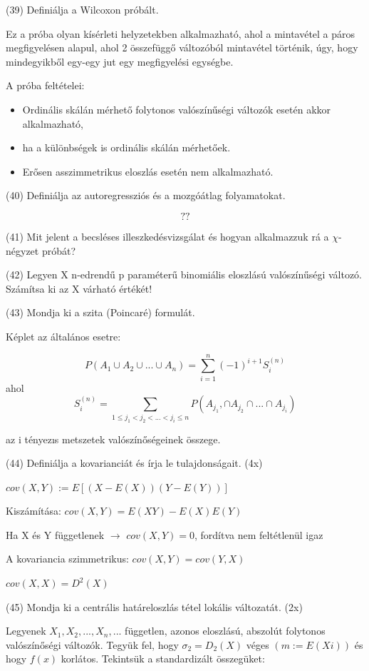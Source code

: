 \documentclass[12p]{article}
\begin{document}
(39) Definiálja a Wilcoxon próbált.

Ez a próba olyan kísérleti helyzetekben alkalmazható, ahol a mintavétel a páros megfigyelésen alapul, ahol 2 összefüggő változóból mintavétel történik, úgy, hogy mindegyikből egy-egy jut egy megfigyelési egységbe.

A próba feltételei:
\begin{itemize}
	\item Ordinális skálán mérhető folytonos valószínűségi változók esetén akkor alkalmazható,
	\item ha a különbségek is ordinális skálán mérhetőek.
	\item Erősen asszimmetrikus eloszlás esetén nem alkalmazható.
\end{itemize}

(40) Definiálja az autoregressziós és a mozgóátlag folyamatokat.

$$??$$

(41) Mit jelent a becsléses illeszkedésvizsgálat és hogyan alkalmazzuk rá a $\chi$-négyzet próbát?

(42) Legyen X n-edrendű p paraméterű binomiális eloszlású valószínűségi változó. Számítsa ki az X várható értékét! 

(43) Mondja ki a szita (Poincaré) formulát.

Képlet az általános esetre:

$$P(A_1 \cup A_2 \cup ... \cup A_n) = \sum^n_{i=1} (-1)^{i+1} S^{(n)}_i$$
ahol
$$S^{(n)}_i = \sum_{1 \leq j_1 < j_2 < ... < j_i \leq n} P(A_{j_1}, \cap A_{j_2} \cap ... \cap A_{j_i})$$

az i tényezıs metszetek
valószínőségeinek összege.

(44) Definiálja a kovarianciát és írja le tulajdonságait. (4x)

$cov(X,Y) := E[(X-E(X))(Y-E(Y))]$

Kiszámítása:
$cov(X,Y) = E(XY)-E(X)E(Y)$

Ha X és Y függetlenek $\rightarrow$ $cov(X,Y) = 0$, fordítva nem feltétlenül igaz

A kovariancia szimmetrikus: $cov(X,Y) = cov(Y,X)$

$cov(X,X) = D^2(X)$

(45) Mondja ki a centrális határeloszlás tétel lokális változatát. (2x)

Legyenek $X_1 , X_2 ,..., X_n ,...$ független, azonos eloszlású, abszolút folytonos valószínőségi változók. Tegyük fel, hogy $\sigma_2=D_2(X)$ véges $(m:=E(Xi))$ és hogy $f(x)$ korlátos. Tekintsük a standardizált összegüket:
\end{document}
